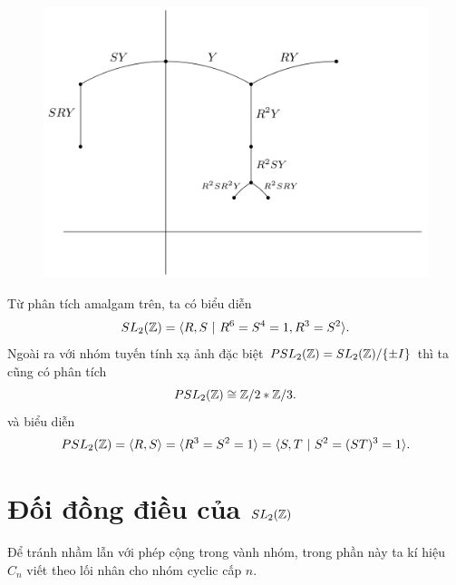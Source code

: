 \begin{figure}[H]
    \includegraphics[width=13cm]{assets/sl2z-tree.png}
    \centering
\end{figure}

\begin{corollary}\label{cor:sl2z-presentation}
    Từ phân tích amalgam trên, ta có biểu diễn
    $$
        SL_2(\mathbb Z) = \langle R,S\ |\ R^6 = S^4 = 1, R^3 = S^2 \rangle.
    $$
    Ngoài ra với nhóm tuyến tính xạ ảnh đặc biệt $PSL_2(\mathbb Z) = SL_2(\mathbb Z) / \{\pm I\}$ thì ta cũng có phân tích
    $$
        PSL_2(\mathbb Z) \cong \mathbb Z/2 * \mathbb Z/3.
    $$
    và biểu diễn
    $$
        PSL_2(\mathbb Z) = \langle R, S \rangle = \langle R^3 = S^2 = 1 \rangle = \langle S, T\ |\ S^2 = (ST)^3 = 1 \rangle.
    $$
\end{corollary}

\section{Đối đồng điều của $SL_2(\mathbb Z)$}
Để tránh nhầm lẫn với phép cộng trong vành nhóm, trong phần này ta kí hiệu $C_n$ viết theo lối nhân cho nhóm cyclic cấp $n$.

